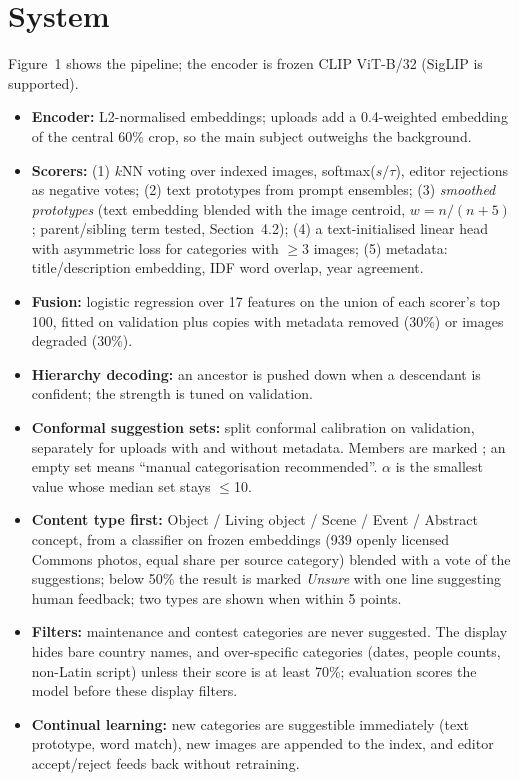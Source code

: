 \documentclass[10pt,twocolumn]{article}
\begin{document}
\section{System}
Figure~1 shows the pipeline; the encoder is frozen CLIP ViT-B/32 (SigLIP is supported).
\begin{itemize}
\item \textbf{Encoder:} L2-normalised embeddings; uploads add a 0.4-weighted embedding of the central 60\%
crop, so the main subject outweighs the background.
\item \textbf{Scorers:} (1) $k$NN voting over indexed images, softmax($s/\tau$), editor rejections as
negative votes; (2) text prototypes from prompt ensembles; (3) \emph{smoothed prototypes} (text embedding
blended with the image centroid, $w{=}n/(n{+}5)$; parent/sibling term tested, Section~4.2); (4) a
text-initialised linear head with asymmetric loss for categories with $\geq$3 images; (5) metadata:
title/description embedding, IDF word overlap, year agreement.
\item \textbf{Fusion:} logistic regression over 17 features on the union of each scorer's top 100,
fitted on validation plus copies with metadata removed (30\%) or images degraded (30\%).
\item \textbf{Hierarchy decoding:} an ancestor is pushed down when a descendant is confident; the strength
is tuned on validation.
\item \textbf{Conformal suggestion sets:} split conformal calibration on validation, separately for uploads
with and without metadata. Members are marked \checkmark; an empty set means ``manual categorisation
recommended''. $\alpha$ is the smallest value whose median set stays $\leq$10.
\item \textbf{Content type first:} Object / Living object / Scene / Event / Abstract concept, from a
classifier on frozen embeddings (939 openly licensed Commons photos, equal share per source category)
blended with a vote of the suggestions; below 50\% the result is marked \emph{Unsure} with one line
suggesting human feedback; two types are shown when within 5 points.
\item \textbf{Filters:} maintenance and contest categories are never suggested. The display hides bare
country names, and over-specific categories (dates, people counts, non-Latin script) unless their score
is at least 70\%; evaluation scores the model before these display filters.
\item \textbf{Continual learning:} new categories are suggestible immediately (text prototype, word
match), new images are appended to the index, and editor accept/reject feeds back without retraining.
\end{itemize}
\end{document}
